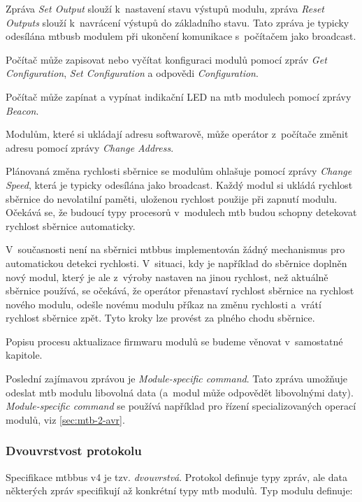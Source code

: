 Zpráva \textit{Set Output} slouží k~nastavení stavu výstupů modulu, zpráva
\textit{Reset Outputs} slouží k~navrácení výstupů do základního stavu.
Tato zpráva je typicky odesílána \gls{mtbusb} modulem při ukončení komunikace
s~počítačem jako broadcast.

Počítač může zapisovat nebo vyčítat konfiguraci modulů pomocí zpráv
\textit{Get Configuration}, \textit{Set Configuration} a odpovědi
\textit{Configuration}.

Počítač může zapínat a vypínat indikační LED na \gls{mtb} modulech pomocí
zprávy \textit{Beacon}.

Modulům, které si ukládají adresu softwarově, může operátor z~počítače změnit
adresu pomocí zprávy \textit{Change Address}.

Plánovaná změna rychlosti sběrnice se modulům ohlašuje pomocí zprávy
\textit{Change Speed}, která je typicky odesílána jako broadcast. Každý modul
si ukládá rychlost sběrnice do nevolatilní paměti, uloženou rychlost použije při
zapnutí modulu. Očekává se, že budoucí typy procesorů v~modulech \gls{mtb} budou
schopny detekovat rychlost sběrnice automaticky.

V~současnosti není na sběrnici \gls{mtbbus} implementován žádný mechanismus pro
automatickou detekci rychlosti.  V~situaci, kdy je například do sběrnice
doplněn nový modul, který je ale z~výroby nastaven na jinou rychlost, než
aktuálně sběrnice používá, se očekává, že operátor přenastaví rychlost sběrnice
na rychlost nového modulu, odešle novému modulu příkaz na změnu rychlosti
a~vrátí rychlost sběrnice zpět. Tyto kroky lze provést za plného chodu sběrnice.

Popisu procesu aktualizace firmwaru modulů se budeme věnovat v~samostatné
kapitole.

Poslední zajímavou zprávou je \textit{Module-specific command}. Tato zpráva
umožňuje odeslat \gls{mtb} modulu libovolná data (a~modul může odpovědět
libovolnými daty). \textit{Module-specific command} se používá například pro
řízení specializovaných operací modulů, viz \ref{sec:mtb-2-avr}.


\subsubsection{Dvouvrstvost protokolu}

Specifikace \gls{mtbbus} v4 je tzv. \textit{dvouvrstvá}. Protokol definuje
typy zpráv, ale data některých zpráv specifikují až konkrétní typy \gls{mtb}
modulů. Typ modulu definuje:


